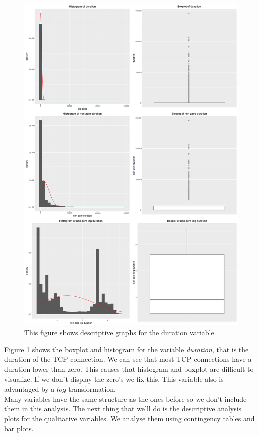 \documentclass[a4paper]{article} %
\begin{document}
\begin{figure}[H]
	\centering
	\includegraphics[scale=0.25]{duration.png}
	\caption{This figure shows descriptive graphs for the duration variable}
	\label{fig:duration}
\end{figure}

Figure \ref{fig:duration} shows the boxplot and histogram for the variable \textit{duration}, that is the duration of the TCP connection. We can see that most TCP connections have a duration lower than zero. This causes that histogram and boxplot are difficult to visualize. If we don't display the zero's we fix this. This variable also is advantaged by a $log$ transformation. \\

Many variables have the same structure as the ones before so we don't include them in this analysis. The next thing that we'll do is the descriptive analysis plots for the qualitative variables. We analyse them using contingency tables and bar plots.
\end{document}
